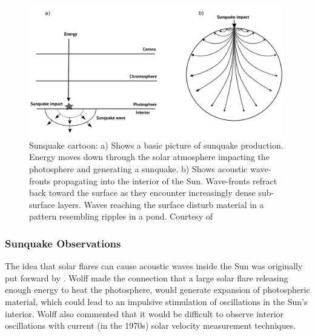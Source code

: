 \begin{figure}[hb]%
  \begin{center}
  \includegraphics[width=0.99\textwidth]{sunquake-cartoon}
  \caption{Sunquake cartoon: a) Shows a basic picture of sunquake production. Energy moves down through the solar atmosphere impacting the photosphere and generating a sunquake. b) Shows acoustic wave-fronts propagating into the interior of the Sun. Wave-fronts refract back toward the surface as they encounter increasingly dense sub-surface layers. Waves reaching the surface disturb material in a pattern resembling ripples in a pond. Courtesy of \cite{2014arXiv1402.1249K}}\label{sunquake-cartoon}
\end{center}
\end{figure}

\subsubsection{Sunquake Observations}
The idea that solar flares can cause acoustic waves inside the Sun was originally put forward by \citep{1972ApJ...176..833W}. Wolff made the connection that a large solar flare releasing enough energy to heat the photosphere, would generate expansion of photospheric material, which could lead to an impulsive stimulation of oscillations in the Sun's interior. Wolff also commented that it would be difficult to observe interior oscillations with current (in the 1970s) solar velocity measurement techniques.

